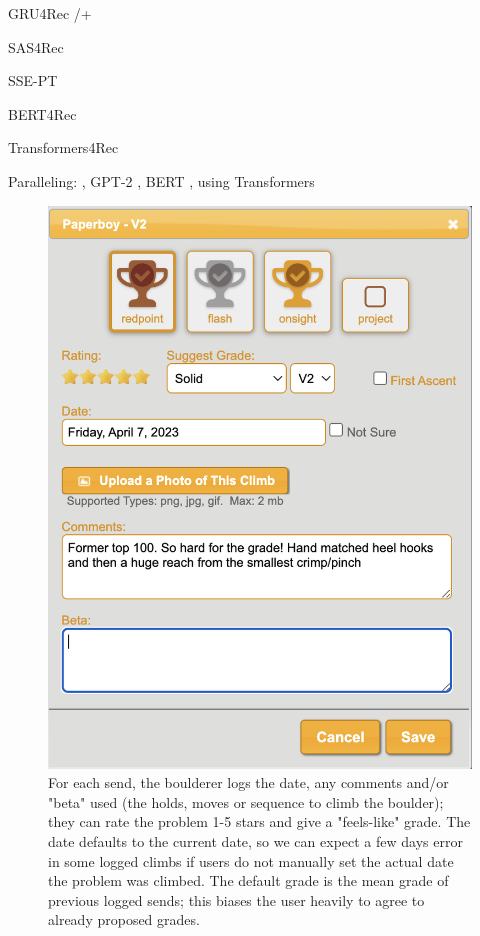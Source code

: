 \documentclass[10pt]{article}
\begin{document}
GRU4Rec /+ \cite{GRU4Rec, GRU4Rec+}

SAS4Rec \cite{SAS4Rec}

SSE-PT \cite{SSE-PT}

BERT4Rec \cite{Bert4Rec}

Transformers4Rec \cite{Transformers4Rec}

Paralleling: \cite{word2vec}, GPT-2 \cite{gpt2}, BERT \cite{Devlin2019}, using Transformers \cite{AttentionAll}



\begin{figure}[h]
  \centering
  \includegraphics[scale=0.4]{sendage.png}
  \caption{For each send, the boulderer logs the date, any comments and/or "beta" used (the holds, moves or sequence to climb the boulder); they can rate the problem 1-5 stars and give a "feels-like" grade. The date defaults to the current date, so we can expect a few days error in some logged climbs if users do not manually set the actual date the problem was climbed. The default grade is the mean grade of previous logged sends; this biases the user heavily to agree to already proposed grades.}
  \label{fig:sendage}
\end{figure}
\end{document}

